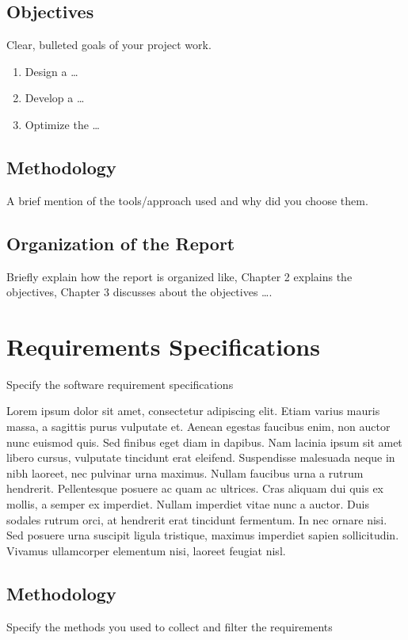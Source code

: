 \documentclass[minor, project]{gptcmdy}
\begin{document}
\section{Objectives}
Clear, bulleted goals of your project work.
\begin{enumerate}
	\item Design a \dots
	\item Develop a \dots
	\item Optimize the \dots
\end{enumerate}

\section{Methodology}

A brief mention of the tools/approach used and why did you choose them.

\section{Organization of the Report}
Briefly explain how the report is organized like, Chapter 2 explains the objectives, Chapter 3 discusses about the objectives \dots.








\chapter{Requirements Specifications}

Specify the software requirement specifications

Lorem ipsum dolor sit amet, consectetur adipiscing elit. Etiam varius mauris massa, a sagittis purus vulputate et. Aenean egestas faucibus enim, non auctor nunc euismod quis. Sed finibus eget diam in dapibus. Nam lacinia ipsum sit amet libero cursus, vulputate tincidunt erat eleifend. Suspendisse malesuada neque in nibh laoreet, nec pulvinar urna maximus. Nullam faucibus urna a rutrum hendrerit. Pellentesque posuere ac quam ac ultrices. Cras aliquam dui quis ex mollis, a semper ex imperdiet. Nullam imperdiet vitae nunc a auctor. Duis sodales rutrum orci, at hendrerit erat tincidunt fermentum. In nec ornare nisi. Sed posuere urna suscipit ligula tristique, maximus imperdiet sapien sollicitudin. Vivamus ullamcorper elementum nisi, laoreet feugiat nisl.


\section{Methodology}
Specify the methods you used to collect and filter the requirements
\end{document}
